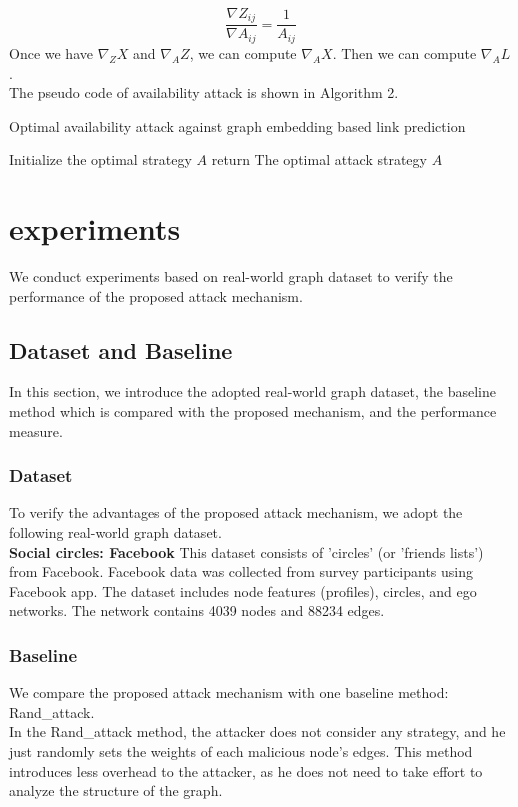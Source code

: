 \documentclass{acmtog} %
\begin{document}
\begin{equation}
\frac { \nabla Z _ { i j } } { \nabla A _ { i j } } = \frac { 1 } { A _ { i j } }
\end{equation}
Once we have $\nabla _ { Z } X$ and $\nabla _ { A } Z$, we can compute $\nabla _ { A } X$. Then we can compute $\nabla _ { A } L$.\\
\indent The pseudo code of availability attack is shown in Algorithm 2.
\begin{algorithm}
	\caption{Optimal availability attack against graph embedding based link prediction}
	
	Initialize the optimal strategy $A$\;
	return The optimal attack strategy $A$\;
\end{algorithm}


\section{experiments}
We conduct experiments based on real-world graph
dataset to verify the performance of the proposed attack mechanism.
\subsection{Dataset and Baseline}
In this section, we introduce the adopted real-world graph dataset, the baseline method which is compared with the proposed mechanism, and the performance measure.
\subsubsection{Dataset}
To verify the advantages of the proposed attack mechanism, we adopt the following real-world graph dataset.\\
\indent \textbf{Social circles: Facebook} This dataset consists of 'circles' (or 'friends lists') from Facebook. Facebook data was collected from survey participants using Facebook app. The dataset includes node features (profiles), circles, and ego networks. The network contains 4039 nodes and 88234 edges.
\subsubsection{Baseline}
We compare the proposed attack
mechanism with one baseline method: Rand\_attack.\\
\indent In the Rand\_attack method, the attacker does not consider any strategy, and he just randomly sets the weights of each malicious node's edges. This method introduces less overhead to the attacker, as he does not need to take effort to analyze the structure of the graph.
\end{document}
